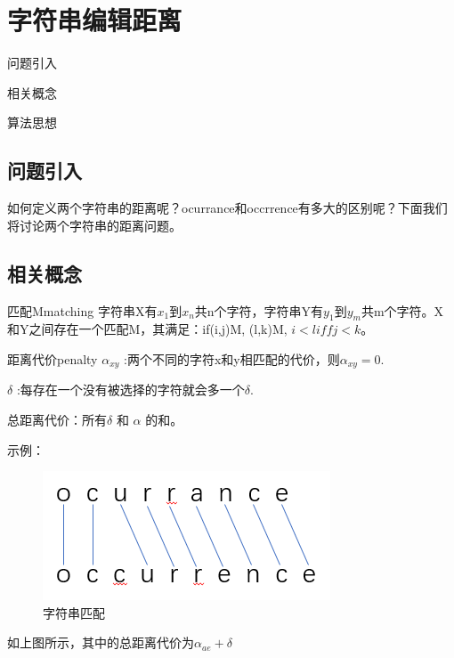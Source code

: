 \chapter{字符串编辑距离}

\begin{instroduction}
	\item 问题引入
	\item 相关概念
	\item 算法思想
\end{instroduction}

\section{问题引入}
如何定义两个字符串的距离呢？ocurrance和occrrence有多大的区别呢？下面我们将讨论两个字符串的距离问题。
\section{相关概念}
\begin{definition}{匹配M}{matching}
	字符串X有$x_1$到$x_n$共n个字符，字符串Y有$y_1$到$y_m$共m个字符。X和Y之间存在一个匹配M，其满足：if(i,j)\in M, (l,k)\in M, $i<l iff j<k$。
\end{definition}





\begin{definition}{距离代价}{penalty}
$\alpha_{xy}$ :两个不同的字符x和y相匹配的代价，则$\alpha_{xy}=0$.

$\delta$ :每存在一个没有被选择的字符就会多一个$\delta$.

总距离代价：所有$\delta$ 和 $\alpha$ 的和。
\end{definition}

示例：

\begin{figure}[htb]
	\centering
	\includegraphics[scale=0.6]{image/connect1.png}
	\caption{字符串匹配}\label{fig:connect1}
\end{figure}
如上图所示，其中的总距离代价为$\alpha_{ae} + \delta$

